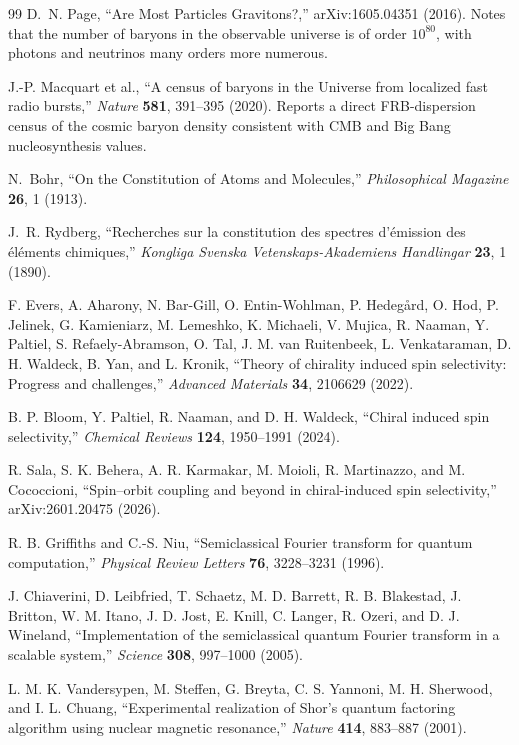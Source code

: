 \documentclass[11pt,a4paper]{article}
\begin{document}
\begin{thebibliography}{99}
D.~N. Page,
``Are Most Particles Gravitons?,''
arXiv:1605.04351 (2016).
Notes that the number of baryons in the observable universe is of order
\(10^{80}\), with photons and neutrinos many orders more numerous.

J.-P. Macquart et al.,
``A census of baryons in the Universe from localized fast radio bursts,''
\textit{Nature} \textbf{581}, 391--395 (2020).
Reports a direct FRB-dispersion census of the cosmic baryon density consistent
with CMB and Big Bang nucleosynthesis values.

N.~Bohr,
``On the Constitution of Atoms and Molecules,''
\textit{Philosophical Magazine} \textbf{26}, 1 (1913).

J.~R. Rydberg,
``Recherches sur la constitution des spectres d'émission des éléments chimiques,''
\textit{Kongliga Svenska Vetenskaps-Akademiens Handlingar}
\textbf{23}, 1 (1890).

F. Evers, A. Aharony, N. Bar-Gill, O. Entin-Wohlman, P. Hedeg{\aa}rd, O. Hod, P. Jelinek, G. Kamieniarz, M. Lemeshko, K. Michaeli, V. Mujica, R. Naaman, Y. Paltiel, S. Refaely-Abramson, O. Tal, J. M. van Ruitenbeek, L. Venkataraman, D. H. Waldeck, B. Yan, and L. Kronik, ``Theory of chirality induced spin selectivity: Progress and challenges,'' \emph{Advanced Materials} \textbf{34}, 2106629 (2022).

B. P. Bloom, Y. Paltiel, R. Naaman, and D. H. Waldeck, ``Chiral induced spin selectivity,'' \emph{Chemical Reviews} \textbf{124}, 1950--1991 (2024).

R. Sala, S. K. Behera, A. R. Karmakar, M. Moioli, R. Martinazzo, and M. Cococcioni, ``Spin--orbit coupling and beyond in chiral-induced spin selectivity,'' arXiv:2601.20475 (2026).

R. B. Griffiths and C.-S. Niu, ``Semiclassical Fourier transform for quantum computation,'' \emph{Physical Review Letters} \textbf{76}, 3228--3231 (1996).

J. Chiaverini, D. Leibfried, T. Schaetz, M. D. Barrett, R. B. Blakestad, J. Britton, W. M. Itano, J. D. Jost, E. Knill, C. Langer, R. Ozeri, and D. J. Wineland, ``Implementation of the semiclassical quantum Fourier transform in a scalable system,'' \emph{Science} \textbf{308}, 997--1000 (2005).

L. M. K. Vandersypen, M. Steffen, G. Breyta, C. S. Yannoni, M. H. Sherwood, and I. L. Chuang, ``Experimental realization of Shor's quantum factoring algorithm using nuclear magnetic resonance,'' \emph{Nature} \textbf{414}, 883--887 (2001).


\end{thebibliography}
\end{document}
